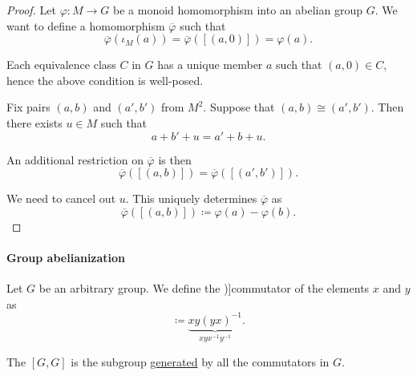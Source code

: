 \begin{proof}
  Let \( \varphi: M \to G \) be a monoid homomorphism into an abelian group \( G \). We want to define a homomorphism \( \overline{\varphi} \) such that
  \begin{equation*}
    \overline{\varphi}(\iota_M(a)) = \overline{\varphi}([(a, 0)]) = \varphi(a).
  \end{equation*}

  Each equivalence class \( C \) in \( G \) has a unique member \( a \) such that \( (a, 0) \in C \), hence the above condition is well-posed.

  Fix pairs \( (a, b) \) and \( (a', b') \) from \( M^2 \). Suppose that \( (a, b) \cong (a', b') \). Then there exists \( u \in M \) such that
  \begin{equation*}
    a + b' + u = a' + b + u.
  \end{equation*}

  An additional restriction on \( \overline{\varphi} \) is then
  \begin{equation*}
    \overline{\varphi}([(a, b)])
    =
    \overline{\varphi}([(a', b')]).
  \end{equation*}

  We need to cancel out \( u \). This uniquely determines \( \overline{\varphi} \) as
  \begin{equation*}
    \overline{\varphi}([(a, b)]) \coloneqq \varphi(a) - \varphi(b).
  \end{equation*}
\end{proof}

\paragraph{Group abelianization}

\begin{definition}\label{def:group_commutator}
  Let \( G \) be an arbitrary group. We define the \term[ru=коммутант (\cite[104]{Мальцев1970})]{commutator} of the elements \( x \) and \( y \) as
  \begin{equation*}
    [x, y] \coloneqq \underbrace{xy(yx)^{-1}}_{xyx^{-1}y^{-1}}.
  \end{equation*}

  The  \( [G, G] \) is the subgroup \hyperref[def:group/submodel]{generated} by all the commutators in \( G \).
\end{definition}

